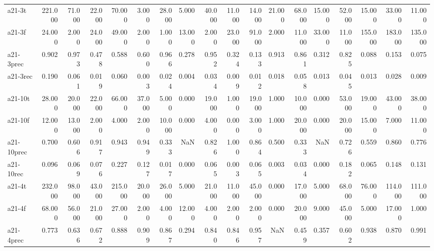 \begin{tabular}{lrrrrrrrrrrrrrrrrr}
a21-3t     &  221.000 &      71.000 &      22.000 &   70.000 &    3.000 &   28.000 &   5.000 &      40.000 &  11.000 &  14.000 &  21.000 &      68.000 &   15.000 &   52.000 &   15.000 &     33.000 &          11.000 \\
a21-3f     &   24.000 &       2.000 &      24.000 &   49.000 &    2.000 &    1.000 &  13.000 &       2.000 &  23.000 &  91.000 &   2.000 &      11.000 &   33.000 &   11.000 &  155.000 &    183.000 &         135.000 \\
a21-3prec  &    0.902 &       0.973 &       0.478 &    0.588 &    0.600 &    0.966 &   0.278 &       0.952 &   0.324 &   0.133 &   0.913 &       0.861 &    0.312 &    0.825 &    0.088 &      0.153 &           0.075 \\
a21-3rec   &    0.190 &       0.061 &       0.019 &    0.060 &    0.003 &    0.024 &   0.004 &       0.034 &   0.009 &   0.012 &   0.018 &       0.058 &    0.013 &    0.045 &    0.013 &      0.028 &           0.009 \\
a21-10t    &   28.000 &      20.000 &      22.000 &   66.000 &   37.000 &    5.000 &   0.000 &      19.000 &   1.000 &  19.000 &   1.000 &      10.000 &    0.000 &   53.000 &   19.000 &     43.000 &          38.000 \\
a21-10f    &   12.000 &      13.000 &       2.000 &    4.000 &    2.000 &   10.000 &   0.000 &       4.000 &   0.000 &   3.000 &   1.000 &      20.000 &    0.000 &   20.000 &   15.000 &      7.000 &          11.000 \\
a21-10prec &    0.700 &       0.606 &       0.917 &    0.943 &    0.949 &    0.333 &     NaN &       0.826 &   1.000 &   0.864 &   0.500 &       0.333 &      NaN &    0.726 &    0.559 &      0.860 &           0.776 \\
a21-10rec  &    0.096 &       0.069 &       0.076 &    0.227 &    0.127 &    0.017 &   0.000 &       0.065 &   0.003 &   0.065 &   0.003 &       0.034 &    0.000 &    0.182 &    0.065 &      0.148 &           0.131 \\
a21-4t     &  232.000 &      98.000 &      43.000 &  215.000 &   20.000 &   26.000 &   5.000 &      21.000 &  11.000 &  45.000 &   0.000 &      17.000 &    5.000 &   68.000 &   76.000 &    114.000 &         111.000 \\
a21-4f     &   68.000 &      56.000 &      21.000 &   27.000 &    2.000 &    4.000 &  12.000 &       4.000 &   2.000 &   2.000 &   0.000 &      20.000 &    9.000 &   45.000 &    5.000 &     17.000 &           1.000 \\
a21-4prec  &    0.773 &       0.636 &       0.672 &    0.888 &    0.909 &    0.867 &   0.294 &       0.840 &   0.846 &   0.957 &     NaN &       0.459 &    0.357 &    0.602 &    0.938 &      0.870 &           0.991 \\

\end{tabular}
